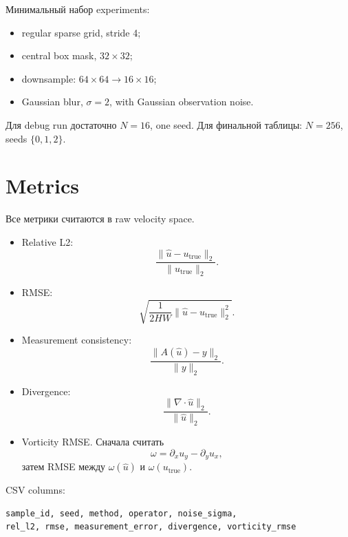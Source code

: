\documentclass[10pt]{article}
\newcommand{\norm}[1]{\lVert#1\rVert}
\begin{document}
Минимальный набор experiments:
\begin{itemize}
  \item regular sparse grid, stride 4;
  \item central box mask, \(32{\times}32\);
  \item downsample: \(64{\times}64 \rightarrow 16{\times}16\);
  \item Gaussian blur, \(\sigma=2\), with Gaussian observation noise.
\end{itemize}

Для debug run достаточно \(N=16\), one seed. Для финальной таблицы: \(N=256\), seeds
\(\{0,1,2\}\).

\section{Metrics}

Все метрики считаются в raw velocity space.

\begin{itemize}
  \item Relative L2:
        \[
            \frac{\norm{\hat u-u_{\mathrm{true}}}_2}
                 {\norm{u_{\mathrm{true}}}_2}.
        \]
  \item RMSE:
        \[
            \sqrt{\frac{1}{2HW}\norm{\hat u-u_{\mathrm{true}}}_2^2}.
        \]
  \item Measurement consistency:
        \[
            \frac{\norm{A(\hat u)-y}_2}{\norm{y}_2}.
        \]
  \item Divergence:
        \[
            \frac{\norm{\nabla\cdot \hat u}_2}{\norm{\hat u}_2}.
        \]
  \item Vorticity RMSE. Сначала считать
        \[
            \omega = \partial_x u_y - \partial_y u_x,
        \]
        затем RMSE между \(\omega(\hat u)\) и \(\omega(u_{\mathrm{true}})\).
\end{itemize}

CSV columns:
\begin{verbatim}
sample_id, seed, method, operator, noise_sigma,
rel_l2, rmse, measurement_error, divergence, vorticity_rmse
\end{verbatim}
\end{document}
